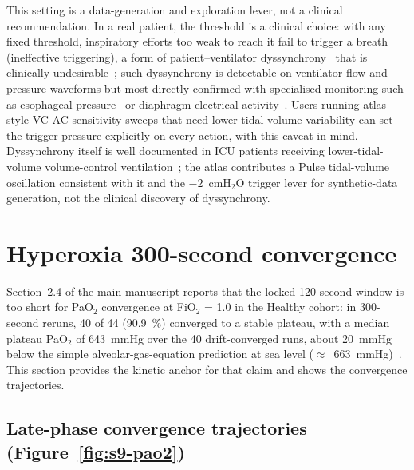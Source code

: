 \documentclass[pdflatex,sn-nature]{sn-jnl}%
\newcommand{\mainref}[2]{#2}
\begin{document}
This setting is a data-generation and exploration lever, not a clinical recommendation. In a real patient, the threshold is a clinical choice: with any fixed threshold, inspiratory efforts too weak to reach it fail to trigger a breath (ineffective triggering), a form of patient--ventilator dyssynchrony~\cite{thille2006} that is clinically undesirable~\cite{blanch2015}; such dyssynchrony is detectable on ventilator flow and pressure waveforms but most directly confirmed with specialised monitoring such as esophageal pressure~\cite{akoumianaki2014} or diaphragm electrical activity~\cite{sinderby1999}. Users running atlas-style VC-AC sensitivity sweeps that need lower tidal-volume variability can set the trigger pressure explicitly on every action, with this caveat in mind. Dyssynchrony itself is well documented in ICU patients receiving lower-tidal-volume volume-control ventilation~\cite{figueroacasas2016}; the atlas contributes a Pulse tidal-volume oscillation consistent with it and the $-2$~cmH$_2$O trigger lever for synthetic-data generation, not the clinical discovery of dyssynchrony.


\section{Hyperoxia 300-second convergence}\label{sec:s9}

Section~\mainref{sec:results-hyperoxia}{2.4} of the main manuscript reports that the locked 120-second window is too short for PaO$_2$ convergence at FiO$_2$ = 1.0 in the Healthy cohort: in 300-second reruns, 40 of 44 (90.9~\%) converged to a stable plateau, with a median plateau PaO$_2$ of 643~mmHg over the 40 drift-converged runs, about 20~mmHg below the simple alveolar-gas-equation prediction at sea level ($\approx$~663~mmHg)~\cite{west2020respiratory}. This section provides the kinetic anchor for that claim and shows the convergence trajectories.

\subsection{Late-phase convergence trajectories (Figure~\ref{fig:s9-pao2})}\label{sec:s9-trajectories}
\end{document}
